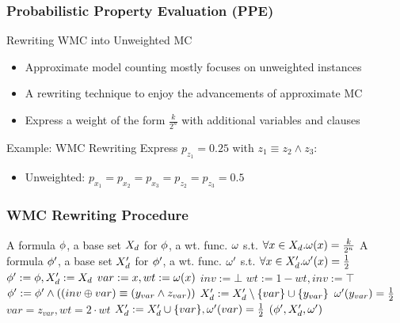 \begin{frame}
  \frametitle{Probabilistic Property Evaluation (PPE)}
  \begin{block}{Rewriting WMC into Unweighted MC}
    \begin{itemize}
      \item Approximate model counting mostly focuses on unweighted instances
            \pause
      \item A rewriting technique to enjoy the advancements of approximate MC
            \pause
      \item Express a weight of the form $\frac{k}{2^n}$ with additional variables and clauses
    \end{itemize}
  \end{block}
  \pause
  \begin{block}{Example: WMC Rewriting}
    Express $p_{z_1}=0.25$ with $z_1\equiv z_2\land z_3$:
    \begin{figure}
      \centering
      
    \end{figure}
    \pause
    \begin{itemize}
      \item Unweighted: $p_{x_1}=p_{x_2}=p_{x_3}=p_{z_2}=p_{z_3}=0.5$
    \end{itemize}
  \end{block}
\end{frame}

\begin{frame}
  \frametitle{WMC Rewriting Procedure}
  {
    \footnotesize
    \begin{algorithmic}[1]
      \REQUIRE A formula $\phi$, a base set $X_d$ for $\phi$,
      a wt. func. $\omega$ s.t. $\forall x\in X_d.\omega(x)=\frac{k}{2^n}$
      \ENSURE A formula $\phi'$, a base set $X_d'$ for $\phi'$,
      a wt. func. $\omega'$ s.t. $\forall x\in X_d'.\omega'(x)=\frac{1}{2}$
      \STATE $\phi':=\phi,X_d':=X_d$
      \STATE $var:=x,wt:=\omega(x)$
      \STATE $inv:=\bot$
      \STATE $wt:=1-wt,inv:=\top$
      \ENDIF
      \STATE $\phi':=\phi'\land((inv \oplus var) \equiv (y_{var} \land z_{var}))$
      \STATE $X_d':=X_d'\setminus\{var\}\cup\{y_{var}\}$
      \STATE $\omega'(y_{var})=\frac{1}{2}$
      \STATE $var=z_{var},wt=2 \cdot wt$
      \ENDWHILE
      \STATE $X_d':=X_d'\cup\{var\},\omega'(var)=\frac{1}{2}$
      \ENDFOR
      \RETURN $(\phi',X_d',\omega')$
    \end{algorithmic}
  }
\end{frame}